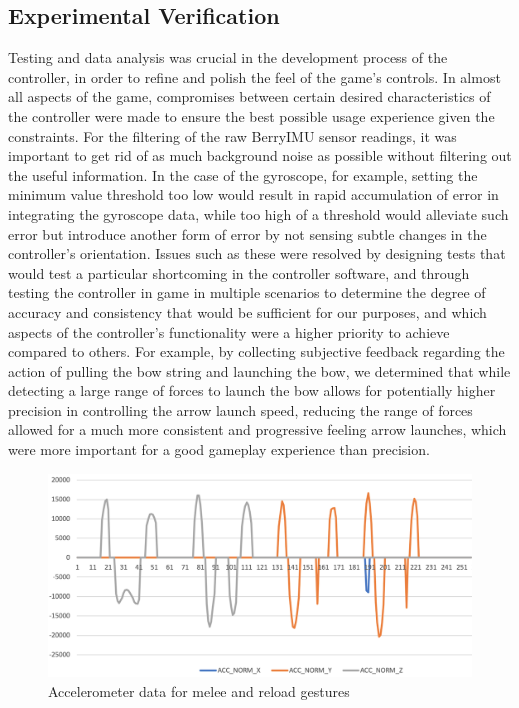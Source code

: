\documentclass[titlepage, 12pt]{scrartcl}
\begin{document}
    \subsection{Experimental Verification}
    Testing and data analysis was crucial in the development process of the controller, in order to refine and polish the feel of the game's controls. In almost all aspects of the game, compromises between certain desired characteristics of the controller were made to ensure the best possible usage experience given the constraints. For the filtering of the raw BerryIMU sensor readings, it was important to get rid of as much background noise as possible without filtering out the useful information. In the case of the gyroscope, for example, setting the minimum value threshold too low would result in rapid accumulation of error in integrating the gyroscope data, while too high of a threshold would alleviate such error but introduce another form of error by not sensing subtle changes in the controller's orientation. Issues such as these were resolved by designing tests that would test a particular shortcoming in the controller software, and through testing the controller in game in multiple scenarios to determine the degree of accuracy and consistency that would be sufficient for our purposes, and which aspects of the controller's functionality were a higher priority to achieve compared to others. For example, by collecting subjective feedback regarding the action of pulling the bow string and launching the bow, we determined that while detecting a large range of forces to launch the bow allows for potentially higher precision in controlling the arrow launch speed, reducing the range of forces allowed for a much more consistent and progressive feeling arrow launches, which were more important for a good gameplay experience than precision. \par
    \begin{figure}
        \centering
        \includegraphics[width=\textwidth]{figures/gestures.png}
        \caption{Accelerometer data for melee and reload gestures}
        \label{fig:gestures}
    \end{figure}
\end{document}
